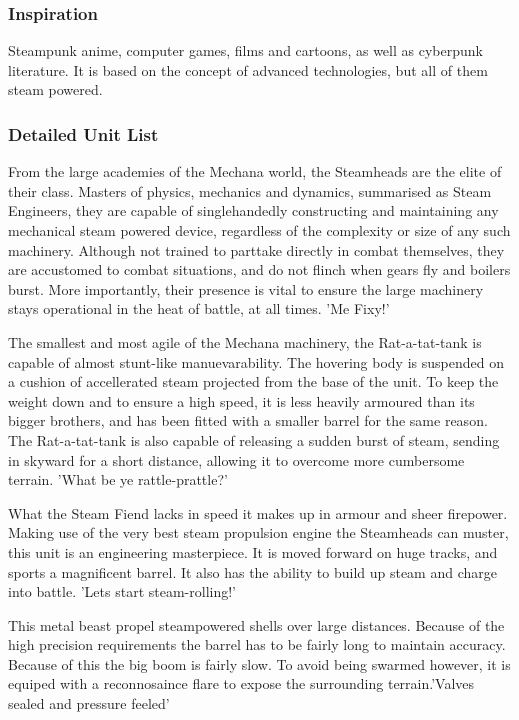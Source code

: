 \documentclass[a4paper]{article}
\begin{document}
\subsubsection{Inspiration}

Steampunk anime, computer games, films and cartoons, as well as cyberpunk literature. It is based on the concept of advanced technologies, but all of them steam powered.

\subsubsection{Detailed Unit List}

From the large academies of the Mechana world, the Steamheads are the elite of their class. Masters of physics, mechanics and dynamics, summarised as Steam Engineers, they are capable of singlehandedly constructing and maintaining any mechanical steam powered device, regardless of the complexity or size of any such machinery. Although not trained to parttake directly in combat themselves, they are accustomed to combat situations, and do not flinch when gears fly and boilers burst. More importantly, their presence is vital to ensure the large machinery stays operational in the heat of battle, at all times. 'Me Fixy!'

The smallest and most agile of the Mechana machinery, the Rat-a-tat-tank is capable of almost stunt-like manuevarability. The hovering body is suspended on a cushion of accellerated steam projected from the base of the unit. To keep the weight down and to ensure a high speed, it is less heavily armoured than its bigger brothers, and has been fitted with a smaller barrel for the same reason. The Rat-a-tat-tank is also capable of releasing a sudden burst of steam, sending in skyward for a short distance, allowing it to overcome more cumbersome terrain. 'What be ye rattle-prattle?'

What the Steam Fiend lacks in speed it makes up in armour and sheer firepower. Making use of the very best steam propulsion engine the Steamheads can muster, this unit is an engineering masterpiece. It is moved forward on huge tracks, and sports a magnificent barrel. It also has the ability to build up steam and charge into battle. 'Lets start steam-rolling!'

This metal beast propel steampowered shells over large distances. Because of the high precision requirements the barrel has to be fairly long to maintain accuracy. Because of this the big boom is fairly slow. To avoid being swarmed however, it is equiped with a reconnosaince flare to expose the surrounding terrain.'Valves sealed and pressure feeled'
\end{document}
